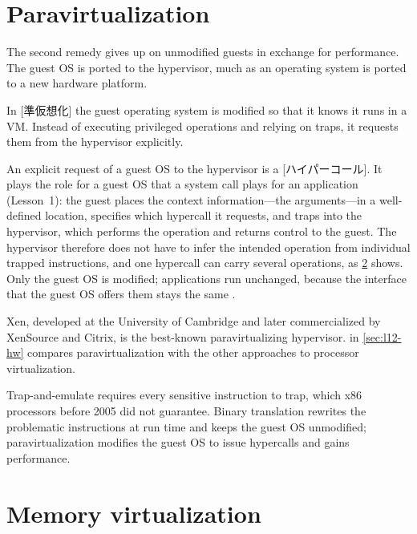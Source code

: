 \documentclass[../main.tex]{subfiles}
\begin{document}
\section{Paravirtualization}
\label{sec:l12-pv}

The second remedy gives up on unmodified guests in exchange for
performance.  The guest OS is ported to the hypervisor, much as an
operating system is ported to a new hardware platform.

\begin{definition}[Paravirtualization]
  In [準仮想化] the guest operating system is
  modified so that it knows it runs in a VM.  Instead of executing
  privileged operations and relying on traps, it requests them from the
  hypervisor explicitly.
\end{definition}

An explicit request of a guest OS to the hypervisor is a
[ハイパーコール].  It plays the role for a guest OS that a
system call plays for an application (Lesson~1): the guest places the
context information---the arguments---in a well-defined location,
specifies which hypercall it requests, and traps into the hypervisor, which
performs the operation and returns control to the guest.  The hypervisor
therefore does not have to infer the intended operation from individual
trapped instructions, and one hypercall can carry several operations, as
\cref{sec:l12-memory} shows.  Only the guest OS is modified; applications
run unchanged, because the interface that the guest OS offers them stays
the same \cite{barham2003}.

Xen, developed at the University of Cambridge and later commercialized by
XenSource and Citrix, is the best-known paravirtualizing hypervisor.
\Cref{tab:l12-cpu} in \cref{sec:l12-hw} compares paravirtualization with
the other approaches to processor virtualization.

\begin{keypoint}
  Trap-and-emulate requires every sensitive instruction to trap, which
  x86 processors before 2005 did not guarantee.  Binary translation
  rewrites the problematic instructions at run time and keeps the guest OS
  unmodified; paravirtualization modifies the guest OS to issue hypercalls
  and gains performance.
\end{keypoint}

\section{Memory virtualization}
\label{sec:l12-memory}
\end{document}
